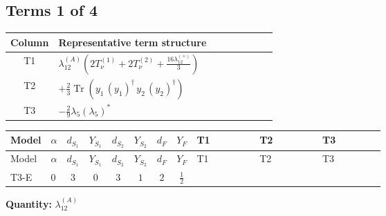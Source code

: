 \documentclass[8pt]{article}
\begin{document}
\begin{landscape}
\subsection*{Terms 1 of 4}
\begin{center}
\begin{tabular}{@{}c >{\raggedright\arraybackslash}p{0.82\linewidth}@{}}
\toprule
Column & Representative term structure \\
\midrule
T1 & \(\displaystyle {\lambda_{12}^{(A)}} \left(2 T_{\nu}^{(1)}+2 T_{\nu}^{(2)}+\frac{16 {\lambda_{12}^{(\times)}}}{3}\right)\) \\
\midrule
T2 & \(\displaystyle +\frac{2}{3} \operatorname{Tr}\!\left({y_1}\,\left({y_1}\right)^{\dagger}\,{y_2}\,\left({y_2}\right)^{\dagger}\right)\) \\
\midrule
T3 & \(\displaystyle -\frac{2}{9} {\lambda_5} \left({\lambda_5}\right)^{*}\) \\
\midrule
\bottomrule
\end{tabular}
\end{center}
\smallskip
\tiny
\begin{longtable}{@{}llcccccc >{\raggedright\arraybackslash}p{0.21\linewidth} >{\raggedright\arraybackslash}p{0.21\linewidth} >{\raggedright\arraybackslash}p{0.21\linewidth}@{}}
\toprule
Model & $\alpha$ & $d_{S_1}$ & $Y_{S_1}$ & $d_{S_2}$ & $Y_{S_2}$ & $d_F$ & $Y_F$ & T1 & T2 & T3 \\
\midrule
\endfirsthead
\toprule
Model & $\alpha$ & $d_{S_1}$ & $Y_{S_1}$ & $d_{S_2}$ & $Y_{S_2}$ & $d_F$ & $Y_F$ & T1 & T2 & T3 \\
\midrule
\endhead
T3-E & $0$ & $3$ & $0$ & $3$ & $1$ & $2$ & $\frac{1}{2}$ & \scriptsize\adjustbox{max width=\linewidth}{$\begin{gathered} {\lambda_{12}^{(A)}} \left(2 T_{\nu}^{(1)}+2 T_{\nu}^{(2)}+\frac{16 {\lambda_{12}^{(\times)}}}{3}\right)\end{gathered}$} & \scriptsize\adjustbox{max width=\linewidth}{$\begin{gathered} +\frac{2}{3} \operatorname{Tr}\!\left({y_1}\,\left({y_1}\right)^{\dagger}\,{y_2}\,\left({y_2}\right)^{\dagger}\right)\end{gathered}$} & \scriptsize\adjustbox{max width=\linewidth}{$\begin{gathered} -\frac{2}{9} {\lambda_5} \left({\lambda_5}\right)^{*}\end{gathered}$} \\
\midrule
\bottomrule
\end{longtable}
\clearpage
\noindent\textbf{Quantity: }$\lambda_{12}^{(A)}$\par\smallskip

\end{landscape}
\end{document}
